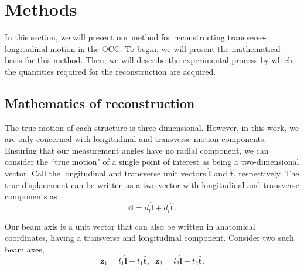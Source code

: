 \documentclass[preprint,NumberedRefs]{JASA}
\begin{document}
\section{Methods}
\par{In this section, we will present our method for reconstructing transverse-longitudinal motion in the OCC. To begin, we will present the mathematical basis for this method. Then, we will describe the experimental process by which the quantities required for the reconstruction are acquired.}
\subsection{Mathematics of reconstruction}
\par{The true motion of each structure is three-dimensional. However, in this work, we are only concerned with longitudinal and transverse motion components. Ensuring that our measurement angles have no radial component, we can consider the ``true motion" of a single point of interest as being a two-dimensional vector. Call the longitudinal and transverse unit vectors $\mathbf{\hat{l}}$ and $\mathbf{\hat{t}}$, respectively. The true displacement can be written as a two-vector with longitudinal and transverse components as 
\begin{equation}
    \mathbf{d} = d_l \mathbf{\hat{l}} + d_t \mathbf{\hat{t}}.
\end{equation}
}
\par{Our beam axis is a unit vector that can also be written in anatomical coordinates, having a transverse and longitudinal component. Consider two such beam axes,
\begin{equation}
    \mathbf{z}_1 = l_1 \mathbf{\hat{l}} + t_1 \mathbf{\hat{t}},\;\;\mathbf{z}_2 = l_2 \mathbf{\hat{l}} + t_2 \mathbf{\hat{t}}.
\end{equation}
}
\end{document}

